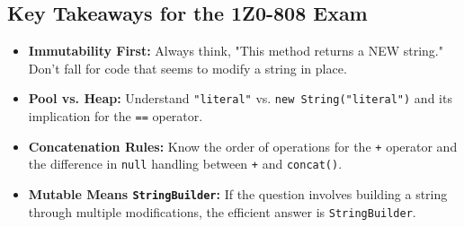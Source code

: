 \documentclass[12pt]{article}
\begin{document}
\begin{enumerate}[label=(\arabic*)]
\section{Key Takeaways for the 1Z0-808 Exam}
\begin{itemize}
    \item \textbf{Immutability First:} Always think, "This method returns a NEW string." Don't fall for code that seems to modify a string in place.
    \item \textbf{Pool vs. Heap:} Understand \texttt{"literal"} vs. \texttt{new String("literal")} and its implication for the \texttt{==} operator.
    \item \textbf{Concatenation Rules:} Know the order of operations for the \texttt{+} operator and the difference in \texttt{null} handling between \texttt{+} and \texttt{concat()}.
    \item \textbf{Mutable Means \texttt{StringBuilder}:} If the question involves building a string through multiple modifications, the efficient answer is \texttt{StringBuilder}.
\end{itemize}
\end{enumerate}
\end{document}
